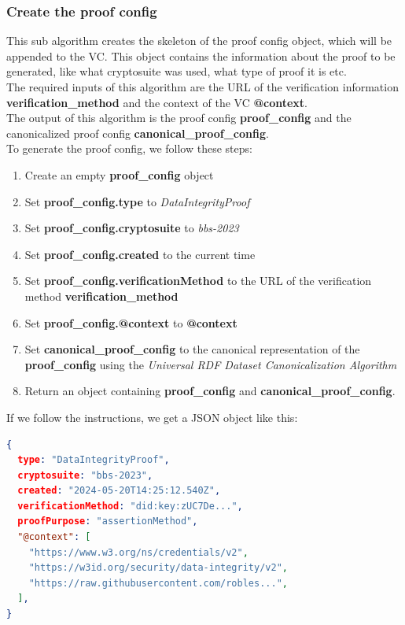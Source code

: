 \documentclass[
	a4paper               %
	,BCOR=0mm            %
	,bibliography=totoc   %
	,listof=totoc         %
	,monolingual
	,twoside=false
]{bfhthesis}              %
\begin{document}
\subsubsection{Create the proof config}
\label{subsec:proof_config}
This sub algorithm creates the skeleton of the proof config object, which will be appended to the VC.
This object contains the information about the proof to be generated, like what cryptosuite was used, what type of proof it is etc.\\

The required inputs of this algorithm are the URL of the verification information \textbf{verification\_method} and the context of the VC \textbf{@context}.\\

The output of this algorithm is the proof config \textbf{proof\_config} and the canonicalized proof config \textbf{canonical\_proof\_config}.\\

To generate the proof config, we follow these steps:
\begin{enumerate}
	\item Create an empty \textbf{proof\_config} object
	\item Set \textbf{proof\_config.type} to \textit{DataIntegrityProof}
	\item Set \textbf{proof\_config.cryptosuite} to \textit{bbs-2023}
	\item Set \textbf{proof\_config.created} to the current time
	\item Set \textbf{proof\_config.verificationMethod} to the URL of the verification method \textbf{verification\_method}
	\item Set \textbf{proof\_config.@context} to \textbf{@context}
	\item Set \textbf{canonical\_proof\_config} to the canonical representation of the \textbf{proof\_config} using the \textit{Universal RDF Dataset Canonicalization Algorithm}\cite{rdf}
	\item Return an object containing \textbf{proof\_config} and \textbf{canonical\_proof\_config}.
\end{enumerate}

If we follow the instructions, we get a JSON object like this:
\begin{lstlisting}[language=json,firstnumber=1,caption={Example Proof Config},captionpos=b]
{
  type: "DataIntegrityProof",
  cryptosuite: "bbs-2023",
  created: "2024-05-20T14:25:12.540Z",
  verificationMethod: "did:key:zUC7De...",
  proofPurpose: "assertionMethod",
  "@context": [
    "https://www.w3.org/ns/credentials/v2",
    "https://w3id.org/security/data-integrity/v2",
    "https://raw.githubusercontent.com/robles...",
  ],
}
\end{lstlisting}
\end{document}
